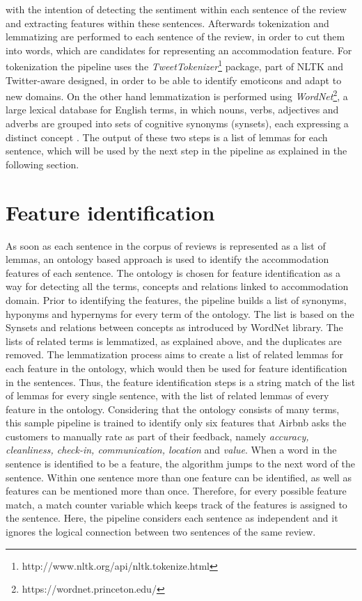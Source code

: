with the intention of detecting the sentiment within each sentence of the review and extracting features within these sentences. 
%
Afterwards tokenization and lemmatizing are performed to each sentence of the review, in order to cut them into words, which are candidates for representing an accommodation feature. For tokenization the pipeline uses the \textit{TweetTokenizer}\footnote{http://www.nltk.org/api/nltk.tokenize.html} package, part of NLTK and Twitter-aware designed, in order to be able to identify emoticons and adapt to new domains. On the other hand lemmatization is performed using \textit{WordNet}\footnote{https://wordnet.princeton.edu/}, a large lexical database for English terms, in which nouns, verbs, adjectives and adverbs are grouped into sets of cognitive synonyms (synsets), each expressing a distinct concept \cite{miller1995wordnet}. The output of these two steps is a list of lemmas for each sentence, which will be used by the next step in the pipeline as explained in the following section.  
%
\section{Feature identification}
As soon as each sentence in the corpus of reviews is represented as a list of lemmas, an ontology based approach is used to identify the accommodation features of each sentence. The ontology is chosen for feature identification as a way for detecting all the terms, concepts and relations linked to accommodation domain. Prior to identifying the features, the pipeline builds a list of synonyms, hyponyms and hypernyms for every term of the ontology. The list is based on the Synsets and relations between concepts as introduced by WordNet library. The lists of related terms is lemmatized, as explained above, and the duplicates are removed. The lemmatization process aims to create a list of related lemmas for each feature in the ontology, which would then be used for feature identification in the sentences.
Thus, the feature identification steps is a string match of the list of lemmas for every single sentence, with the list of related lemmas of every feature in the ontology. Considering that the ontology consists of many terms, this sample pipeline is trained to identify only six features that Airbnb asks the customers to manually rate as part of their feedback, namely \textit{accuracy, cleanliness, check-in, communication, location} and \textit{value}. 
When a word in the sentence is identified to be a feature, the algorithm jumps to the next word of the sentence. Within one sentence more than one feature can be identified, as well as features can be mentioned more than once. Therefore, for every possible feature match, a match counter variable which keeps track of the features is assigned to the sentence. Here, the pipeline considers each sentence as independent and it ignores the logical connection between two sentences of the same review.

